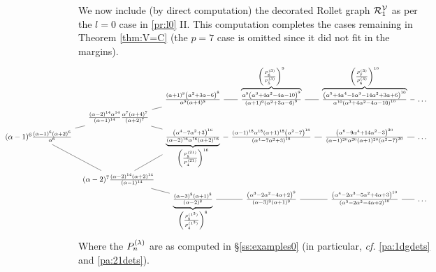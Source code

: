 \mdef \label{pa:l1}
We now include 
(by direct computation)
the 
decorated Rollet graph ${\mathcal{R}}^{{\mathcal V}}_1$ as per the $l=0$ case in \ref{pr:l0} II. This computation completes the cases remaining in Theorem \ref{thm:V=C} (the $p=7$ case is omitted since it did not fit in the margins).
\[
\hspace{-4.51cm} 
\begin{tikzcd}[column sep=0.6em,row sep=0em]
&&&\frac{(\alpha +1)^8 \left(\alpha ^2+3 \alpha -6\right)^8}{\alpha ^8 (\alpha +4)^8}\ar[dash,r]
   &
   \overbrace{
   \tfrac{\alpha ^9 \left(\alpha ^3+4 \alpha ^2-4 \alpha -10\right)^9}{(\alpha +1)^9 \left(\alpha ^2+3 \alpha -6\right)^9}   }^{ \left( \frac{ P^{(3)}_{\ppmm{6}}}{P^{(3)}_{5}} \right)^9}   \ar[dash,r]
   &
   \overbrace{
   \tfrac{\left(\alpha ^5+4 \alpha ^4-5 \alpha ^3-14 \alpha ^2+3 \alpha +6\right)^{10}}{\alpha ^{10} \left(\alpha ^3+4 \alpha ^2-4 \alpha -10\right)^{10}}   }^{  \left( \frac{ P^{(3)}_{\ppmm{7}}}{P^{(3)}_{6}} \right)^{10}  }   \ar[dash,r]
   &\dots
   \\
&&\frac{(\alpha -2)^{14} \alpha ^{14}}{(\alpha -1)^{14}} \frac{\a^7(\alpha +4)^7}{(\alpha +2)^7}\arrow[dash,ur]\arrow[dash,dr]
\\
\alpha ^3\arrow[dash,r] & (\alpha -1)^{6}\frac{(\alpha -1)^{6} (\alpha +2)^6}{\alpha ^6}\arrow[dash,ur]\arrow[dash,dr] 
  &&
  \underbrace{
  \tfrac{\left(\alpha ^4-7 \alpha ^2+3\right)^{16}}{(\alpha -2)^{16} \alpha ^{16} (\alpha +2)^{16}} }_{  \left( \frac{ P^{(21)}_{\ppmm{5}}}{P^{(21)}_{4}} \right)^{16}     } 
    \ar[dash,r]
  &
  \frac{(\alpha -1)^{18} \alpha ^{18} (\alpha +1)^{18} \left(\alpha ^2-7\right)^{18}}{\left(\alpha ^4-7 \alpha ^2+3\right)^{18}}\ar[dash,r]&\frac{\left(\alpha ^6-9 \alpha ^4+14 \alpha ^2-3\right)^{20}}{(\alpha -1)^{20} \alpha ^{20} (\alpha +1)^{20} \left(\alpha ^2-7\right)^{20}}\ar[dash,r]&\dots
\\
&&(\alpha -2)^{7}\frac{(\alpha -2)^{14} (\alpha +2)^{14}}{(\alpha -1)^{14}}\arrow[dash,ur]\arrow[dash,dr]
\\
&&&
  \underbrace{
  \tfrac{(\alpha -3)^8 (\alpha +1)^8}{(\alpha -2)^8} }_{ \left( \frac{ P^{(1^3)}_{\ppmm{5}}}{P^{(1^3)}_{4}} \right)^{8}    }     \ar[dash,r]
  &
  \frac{\left(\alpha ^3-2 \alpha ^2-4 \alpha +2\right)^9}{(\alpha -3)^9 (\alpha +1)^9}\ar[dash,r]&\frac{\left(\alpha ^4-2 \alpha ^3-5 \alpha ^2+4 \alpha +3\right)^{10}}{\left(\alpha ^3-2 \alpha ^2-4 \alpha +2\right)^{10}}\ar[dash,r]&\dots
\end{tikzcd}
\]    
Where the $P_{n}^{(\lambda)}$ are as computed in \S\ref{ss:examples0} (in particular, \textit{cf.} \ref{pa:1dgdets} and \ref{pa:21dets}).

